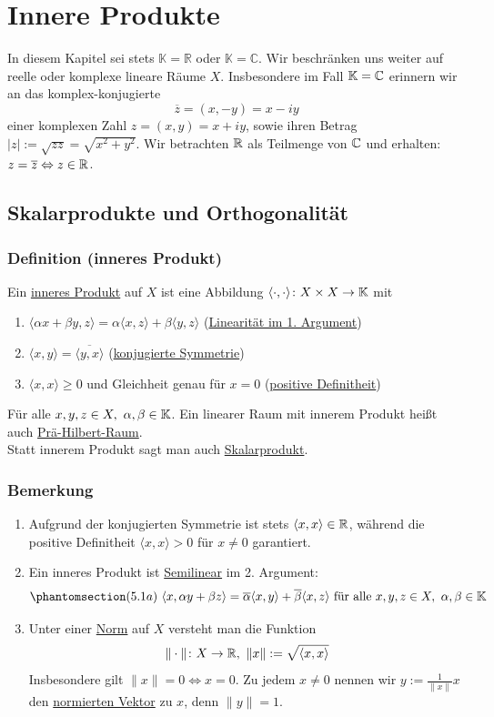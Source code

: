 \section{Innere Produkte}
In diesem Kapitel sei stets $\mathbb{K}=\mathbb{R}$ oder $\mathbb{K}=\mathbb{C}$.  Wir beschränken uns weiter auf reelle oder komplexe lineare Räume $X$.  Insbesondere im Fall $\mathbb{K} = \mathbb{C}$ erinnern wir an das komplex-konjugierte
\[\overline{z}=(x,-y)=x-iy\]
einer komplexen Zahl $z=(x,y)=x+iy$, sowie ihren Betrag $\left|z\right|:=\sqrt{zz}=\sqrt{x^2+y^2}$.  Wir betrachten $\mathbb{R}$ als Teilmenge von $\mathbb{C}$ und erhalten: $z=\overline{z}\Leftrightarrow z\in \mathbb{R}$.
\subsection{Skalarprodukte und Orthogonalität}
\subsubsection{Definition (inneres Produkt)}
\label{5.1.1}
Ein \underline{inneres Produkt} auf $X$ ist eine Abbildung $\langle\cdot ,\cdot \rangle\colon X\times X\rightarrow \mathbb{K}$ mit
\romannum
\begin{enumerate}
\item $\langle\alpha x+\beta y,z\rangle=\alpha \langle x,z\rangle+\beta \langle y,z\rangle$ (\underline{Linearität im 1. Argument})
\item $\langle x,y\rangle=\overline{\langle y,x\rangle}$ (\underline{konjugierte Symmetrie})
\item $\langle x,x\rangle\geq 0$ und Gleichheit genau für $x=0$ (\underline{positive Definitheit})
\end{enumerate}
Für alle $x,y,z\in X,\ \alpha,\beta \in \mathbb{K}$.  Ein linearer Raum mit innerem Produkt heißt auch \underline{Prä-Hilbert-Raum}.\\
Statt innerem Produkt sagt man auch \underline{Skalarprodukt}.
\subsubsection{Bemerkung}
\numbers
\begin{enumerate}
\item Aufgrund der konjugierten Symmetrie ist stets $\langle x,x\rangle\in \mathbb{R}$, während die positive Definitheit $\langle x,x\rangle>0$ für $x\not=0$ garantiert.
\item Ein inneres Produkt ist \underline{Semilinear} im 2. Argument:
\[\phantomsection\label{5.1a}(5.1a)\ \langle x,\alpha y+\beta z\rangle=\overline{\alpha }\langle x,y\rangle+\overline{\beta }\langle x,z\rangle\text{ für alle } x,y,z \in X,\ \alpha, \beta \in \K\]
\item Unter einer \underline{Norm} auf $X$ versteht man die Funktion
\[\|\cdot \|\colon X\rightarrow \mathbb{R},\ \|x\| :=\sqrt{\langle x,x\rangle}\]
Insbesondere gilt $\|x\|=0\Leftrightarrow x=0$.  Zu jedem $x\not=0$ nennen wir $y:=\frac{1}{\|x\|}x$ den \underline{normierten Vektor} zu $x$, denn $\|y\|=1$.
\end{enumerate}
